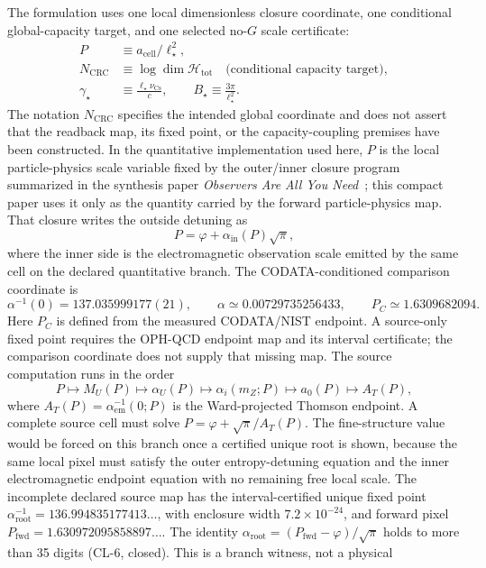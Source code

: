 \documentclass[11pt]{article}
\begin{document}
The formulation uses one local dimensionless closure coordinate, one conditional global-capacity
target, and one selected no-\(G\) scale certificate:
\begin{align}
P &\equiv a_{\mathrm{cell}}/\ell_\star^2,\\
N_{\mathrm{CRC}} &\equiv \log \dim \mathcal H_{\mathrm{tot}}\quad\text{(conditional capacity target)},\\
\gamma_\star&\equiv \frac{\ell_\star\nu_{\mathrm{Cs}}}{c},
\qquad
B_\star\equiv \frac{3\pi}{\ell_\star^2}.
\end{align}
The notation \(N_{\mathrm{CRC}}\) specifies the intended global coordinate and does not assert that
the readback map, its fixed point, or the capacity-coupling premises have been constructed.
In the quantitative implementation used here, \(P\) is the local particle-physics scale variable
fixed by the outer/inner closure program summarized in the synthesis paper
\emph{Observers Are All You Need}~\cite{ophsynthesis}; this compact paper uses it only as the
quantity carried by the forward particle-physics map. That closure writes the outside
detuning as
\[
P=\varphi+\alpha_{\mathrm{in}}(P)\sqrt{\pi},
\]
where the inner side is the electromagnetic observation scale emitted by the same cell on the
declared quantitative branch. The CODATA-conditioned comparison coordinate is
\[
\alpha^{-1}(0)=137.035999177(21),\qquad
\alpha\simeq0.00729735256433,\qquad
P_C\simeq1.6309682094.
\]
Here \(P_C\) is defined from the measured CODATA/NIST endpoint. A source-only fixed point requires
the OPH-QCD endpoint map and its interval certificate; the comparison coordinate does not supply
that missing map.
The source computation runs in the order
\[
P\mapsto M_U(P)\mapsto\alpha_U(P)\mapsto\alpha_i(m_Z;P)\mapsto
a_0(P)\mapsto A_T(P),
\]
where \(A_T(P)=\alpha_{\mathrm{em}}^{-1}(0;P)\) is the Ward-projected Thomson
endpoint. A complete source cell must solve
\(P=\varphi+\sqrt{\pi}/A_T(P)\).
The fine-structure value would be forced on this branch once a certified
unique root is shown, because the same local pixel
must satisfy the outer entropy-detuning equation and the inner electromagnetic
endpoint equation with no remaining free local scale.
The incomplete declared source map has the interval-certified unique fixed
point \(\alpha_{\mathrm{root}}^{-1}=136.994835177413\ldots\), with enclosure
width \(7.2\times10^{-24}\), and forward pixel
\(P_{\mathrm{fwd}}=1.630972095858897\ldots\). The identity
\(\alpha_{\mathrm{root}}=(P_{\mathrm{fwd}}-\varphi)/\sqrt{\pi}\) holds to more
than 35 digits (CL-6, closed). This is a branch witness, not a physical
\end{document}
